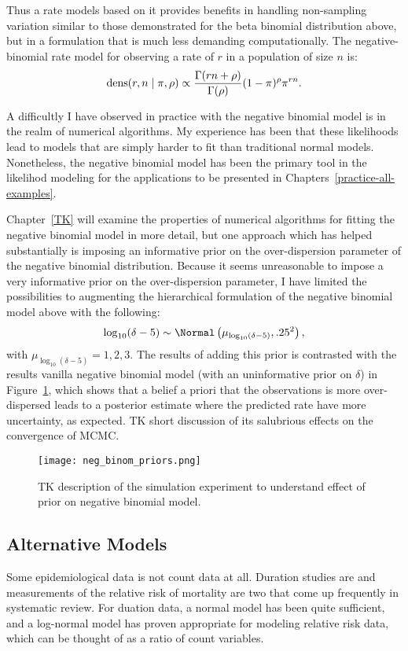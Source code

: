 Thus a rate models based on it provides benefits in handling
non-sampling variation similar to those demonstrated for the beta
binomial distribution above, but in a formulation that is much less
demanding computationally.  The negative-binomial rate model for
observing a rate of $r$ in a population of size $n$ is:
\[
\operatorname{dens}(r,n\;|\; \pi, \rho) \propto \frac{\Gamma(rn+\rho)}{\Gamma(\rho)} (1-\pi)^\rho \pi^{rn}.
\]

A difficultly I have observed in practice with the negative binomial
model is in the realm of numerical algorithms.  My experience has been that these
likelihoods lead to models that are simply harder to fit than
traditional normal models.  Nonetheless, the negative binomial model
has been the primary tool in the likelihod modeling for the
applications to be presented in Chapters~\ref{practice-all-examples}.

Chapter~\ref{TK} will examine the properties of numerical algorithms
for fitting the negative binomial model in more detail, but one
approach which has helped substantially is imposing an informative
prior on the over-dispersion parameter of the negative binomial
distribution.  Because it seems unreasonable to impose a very informative prior on the over-dispersion parameter, I have limited the possibilities to augmenting the hierarchical formulation of the negative binomial model above with the following:
\[
\log_{10} (\delta-5) \sim \Normal\left(\mu_{\log_{10}(\delta-5)}, .25^2\right),
\]
with $\mu_{\log_{10}(\delta-5)} = 1, 2, 3$.  The results of adding this
prior is contrasted with the results vanilla negative binomial model
(with an uninformative prior on $\delta$) in
Figure~\ref{fig:theory-rate_model-neg_binom_priors}, which shows that
a belief a priori that the observations is more over-dispersed leads
to a posterior estimate where the predicted rate have more
uncertainty, as expected.  TK short discussion of its salubrious
effects on the convergence of MCMC.

\begin{figure}
\begin{center}
\texttt{[image: neg\_binom\_priors.png]}
\end{center}
\caption{TK description of the simulation experiment to understand effect of prior on negative binomial model.}
\label{fig:theory-rate_model-neg_binom_priors}
\end{figure}

\subsection{Alternative Models}
Some epidemiological data is not count data at all.  Duration studies
are and measurements of the relative risk of mortality are two that
come up frequently in systematic review.  For duation data, a normal
model  has been quite sufficient, and a log-normal model has proven
appropriate for modeling relative risk data, which can be thought of
as a ratio of count variables.

